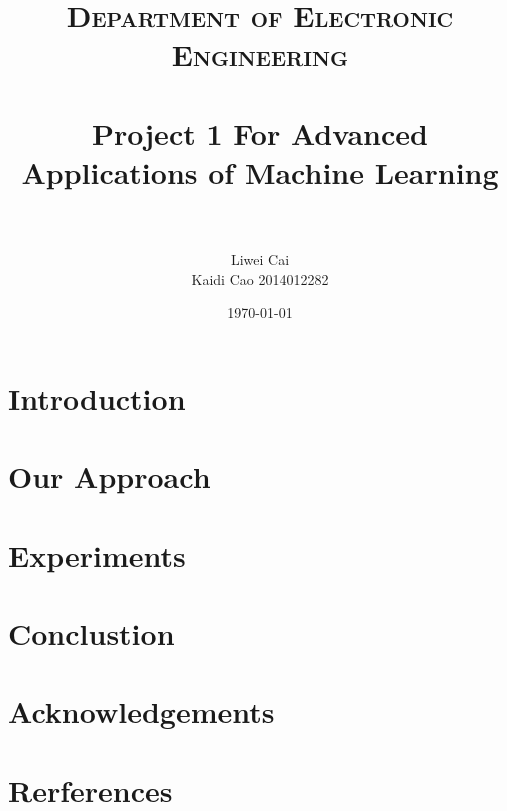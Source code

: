 \documentclass[10pt,a4paper]{article}
\title{	
\normalfont \normalsize
\textsc{Department of Electronic Engineering} \\ [25pt]
\horrule{0.5pt} \\[0.4cm] %
\huge Project 1 For Advanced Applications of Machine Learning\\ %
\horrule{2pt} \\[0.5cm] %
}
\author{ Liwei Cai\\
	Kaidi Cao 2014012282 } %
\date{\normalsize\today} %
\begin{document}
	
\begin{spacing}{1.5}
\begin{titlepage}
\maketitle %
\end{titlepage}

\newpage

\section{Introduction}

\section{Our Approach}

\section{Experiments}

\section{Conclustion}

\section*{Acknowledgements}

\newpage

\section*{Rerferences}

\end{spacing}
\end{document}
